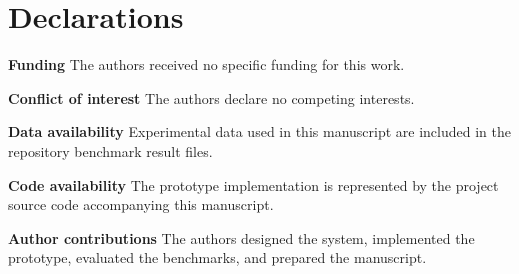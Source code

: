 \documentclass[pdflatex,sn-mathphys-num]{sn-jnl}
\begin{document}
\section*{Declarations}

\textbf{Funding} The authors received no specific funding for this work.

\textbf{Conflict of interest} The authors declare no competing interests.

\textbf{Data availability} Experimental data used in this manuscript are included in the repository benchmark result files.

\textbf{Code availability} The prototype implementation is represented by the project source code accompanying this manuscript.

\textbf{Author contributions} The authors designed the system, implemented the prototype, evaluated the benchmarks, and prepared the manuscript.
\end{document}

